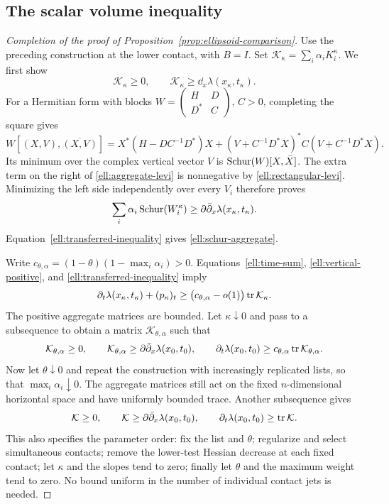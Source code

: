 \subsection{The scalar volume inequality}

\begin{proof}[Completion of the proof of Proposition~\ref{prop:ellipsoid-comparison}]
Use the preceding construction at the lower contact, with $B=I$.
Set $\mathcal K_\kappa=\sum_i\alpha_iK_i^\kappa$.
We first show
\begin{equation}\label{ell:schur-aggregate}
 \mathcal K_\kappa\ge0,
 \qquad \mathcal K_\kappa\ge\dd_x\lambda(x_\kappa,t_\kappa).
\end{equation}
For a Hermitian form with blocks
$W=\left(\begin{smallmatrix}H&D\\D^*&C\end{smallmatrix}\right)$,
$C>0$, completing the square gives
\[
 W[(X,V),\overline{(X,V)}]
 =X^*(H-DC^{-1}D^*)X
   +(V+C^{-1}D^*X)^*C(V+C^{-1}D^*X).
\]
Its minimum over the complex vertical vector $V$ is
$\operatorname{Schur}(W)[X,\bar X]$.  The extra term on the right of
\eqref{ell:aggregate-levi} is nonnegative by
\eqref{ell:rectangular-levi}.  Minimizing the left side independently
over every $V_i$ therefore proves
\[
 \sum_i\alpha_i\operatorname{Schur}(W_i^\kappa)
 \ge\partial\bar\partial_x\lambda(x_\kappa,t_\kappa).
\]
Equation~\eqref{ell:transferred-inequality} gives
\eqref{ell:schur-aggregate}.

Write $c_{\theta,\alpha}=(1-\theta)(1-\max_i\alpha_i)>0$.
Equations~\eqref{ell:time-sum}, \eqref{ell:vertical-positive}, and
\eqref{ell:transferred-inequality} imply
\begin{equation}\label{ell:aggregate-trace}
 \partial_t\lambda(x_\kappa,t_\kappa)+(p_\kappa)_t
 \ge\bigl(c_{\theta,\alpha}-o(1)\bigr)\operatorname{tr}\mathcal K_\kappa.
\end{equation}
The positive aggregate matrices are bounded.  Let $\kappa\downarrow0$
and pass to a subsequence to obtain a matrix $\mathcal K_{\theta,\alpha}$
such that
\[
 \mathcal K_{\theta,\alpha}\ge0,\qquad
 \mathcal K_{\theta,\alpha}\ge\partial\bar\partial_x\lambda(x_0,t_0),\qquad
 \partial_t\lambda(x_0,t_0)
       \ge c_{\theta,\alpha}\operatorname{tr}\mathcal K_{\theta,\alpha}.
\]
Now let $\theta\downarrow0$ and repeat the construction with increasingly
replicated lists, so that $\max_i\alpha_i\downarrow0$.
The aggregate matrices still act on the fixed $n$-dimensional
horizontal space and have uniformly bounded trace.  Another
subsequence gives
\begin{equation}\label{ell:limiting-majorant}
 \mathcal K\ge0,\qquad \mathcal K\ge\partial\bar\partial_x\lambda(x_0,t_0),
 \qquad \partial_t\lambda(x_0,t_0)\ge\operatorname{tr}\mathcal K.
\end{equation}
This also specifies the parameter order: fix the list and $\theta$;
regularize and select simultaneous contacts; remove the lower-test
Hessian decrease at each fixed contact; let $\kappa$ and the slopes
tend to zero; finally let $\theta$ and the maximum weight tend to zero.
No bound uniform in the number of individual contact jets is needed.


\end{proof}
